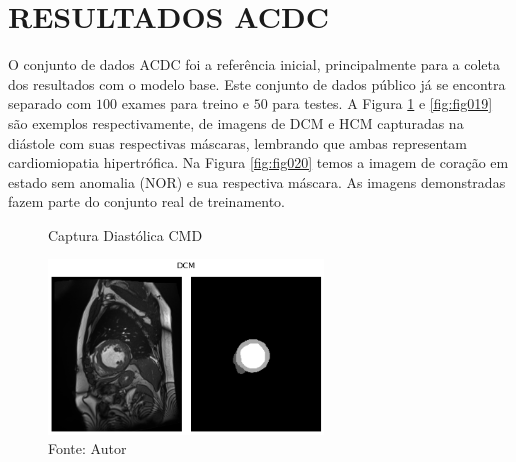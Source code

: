 




\section{RESULTADOS ACDC}
\label{sec:resultados_acdc}

O conjunto de dados \gls{ACDC} foi a referência inicial, principalmente para a coleta dos resultados com o modelo base. Este conjunto de dados público já se encontra separado com $100$ exames para treino e $50$ para testes. A Figura \ref{fig:fig018} e \ref{fig:fig019} são exemplos respectivamente, de imagens de \gls{DCM} e \gls{HCM} capturadas na diástole com suas respectivas máscaras, lembrando que ambas representam cardiomiopatia hipertrófica. Na Figura \ref{fig:fig020} temos a imagem de coração em estado sem anomalia (\gls{NOR}) e sua respectiva máscara. As imagens demonstradas fazem parte do conjunto real de treinamento.

\begin{figure}[h!]
    \centering
    \caption{Captura Diastólica CMD}
    \includegraphics[width=0.65\textwidth]{figures/fig018.png}
    \caption*{Fonte: Autor}
    \label{fig:fig018}
\end{figure}

